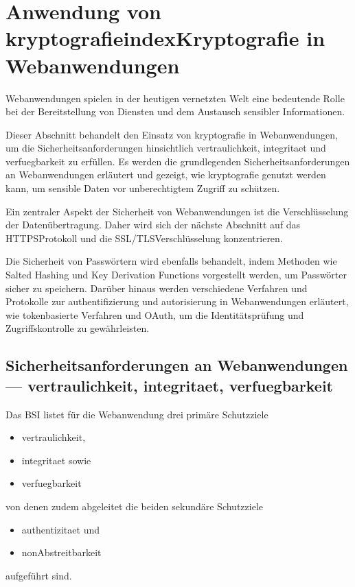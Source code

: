\newpage
\section[Anwendung von Kryptografie in Webanwendungen]{Anwendung von \gls{kryptografie}index{Kryptografie} in Webanwendungen}\label{sec:anwendung_von_kryptografie_in_webanwendungen}
Webanwendungen spielen in der heutigen vernetzten Welt eine bedeutende Rolle bei der Bereitstellung von Diensten und dem Austausch sensibler Informationen.

Dieser Abschnitt behandelt den Einsatz von \Gls{kryptografie} in Webanwendungen, um die Sicherheitsanforderungen hinsichtlich \gls{vertraulichkeit}, \gls{integritaet} und \gls{verfuegbarkeit} zu erfüllen.
Es werden die grundlegenden Sicherheitsanforderungen an Webanwendungen erläutert und gezeigt, wie \Gls{kryptografie} genutzt werden kann, um sensible Daten vor unberechtigtem Zugriff zu schützen.

Ein zentraler Aspekt der Sicherheit von Webanwendungen ist die Verschlüsselung der Datenübertragung.
Daher wird sich der nächste Abschnitt auf das \ac{HTTPS}\nonbreakdash Protokoll und die \ac{SSL}/\ac{TLS}\nonbreakdash Verschlüsselung konzentrieren.

Die Sicherheit von Passwörtern wird ebenfalls behandelt, indem Methoden wie Salted Hashing und Key Derivation Functions vorgestellt werden, um Passwörter sicher zu speichern.
Darüber hinaus werden verschiedene Verfahren und Protokolle zur \gls{authentifizierung} und \gls{autorisierung} in Webanwendungen erläutert, wie \zb tokenbasierte Verfahren und OAuth, um die Identitätsprüfung und Zugriffskontrolle zu gewährleisten.

\subsection[Sicherheitsanforderungen an Webanwendungen]{Sicherheitsanforderungen an Webanwendungen — \gls{vertraulichkeit}, \gls{integritaet}, \gls{verfuegbarkeit}}\label{subsec:sicherheitsanforderungen-an-webanwendungen}

Das \ac{BSI} listet für die Webanwendung drei primäre Schutzziele
\begin{samepage}
    \begin{itemize}
        \item \gls{vertraulichkeit},
        \item \gls{integritaet} sowie
        \item \gls{verfuegbarkeit}
    \end{itemize}
\end{samepage}
von denen zudem abgeleitet \ua die beiden sekundäre Schutzziele
\begin{samepage}
    \begin{itemize}
        \item \gls{authentizitaet} und
        \item \gls{nonAbstreitbarkeit}
    \end{itemize}
\end{samepage}
aufgeführt sind\autocite[\pagef~8]{bsi-leitfaden-2022}.

